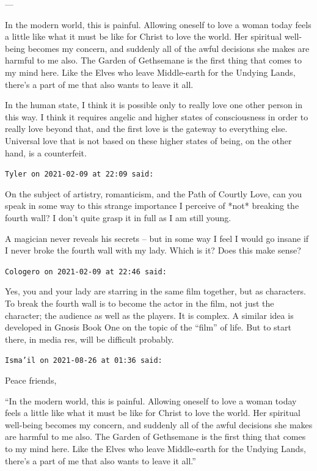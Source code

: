 \begin{footnotesize}
\begin{sffamily}
—

In the modern world, this is painful. Allowing oneself to love a woman today feels a little like what it must be like for Christ to love the world. Her spiritual well-being becomes my concern, and suddenly all of the awful decisions she makes are harmful to me also. The Garden of Gethsemane is the first thing that comes to my mind here. Like the Elves who leave Middle-earth for the Undying Lands, there's a part of me that also wants to leave it all.

In the human state, I think it is possible only to really love one other person in this way. I think it requires angelic and higher states of consciousness in order to really love beyond that, and the first love is the gateway to everything else. Universal love that is not based on these higher states of being, on the other hand, is a counterfeit.


\hfill

\texttt{Tyler on 2021-02-09 at 22:09 said: }

On the subject of artistry, romanticism, and the Path of Courtly Love, can you speak in some way to this strange importance I perceive of *not* breaking the fourth wall? I don't quite grasp it in full as I am still young.

A magician never reveals his secrets – but in some way I feel I would go insane if I never broke the fourth wall with my lady. Which is it? Does this make sense?


\hfill

\texttt{Cologero on 2021-02-09 at 22:46 said: }

Yes, you and your lady are starring in the same film together, but as characters. To break the fourth wall is to become the actor in the film, not just the character; the audience as well as the players. It is complex. A similar idea is developed in Gnosis Book One on the topic of the “film” of life. But to start there, in media res, will be difficult probably.


\hfill

\texttt{Isma'il on 2021-08-26 at 01:36 said: }

Peace friends,

“In the modern world, this is painful. Allowing oneself to love a woman today feels a little like what it must be like for Christ to love the world. Her spiritual well-being becomes my concern, and suddenly all of the awful decisions she makes are harmful to me also. The Garden of Gethsemane is the first thing that comes to my mind here. Like the Elves who leave Middle-earth for the Undying Lands, there's a part of me that also wants to leave it all.”


\end{sffamily}
\end{footnotesize}
